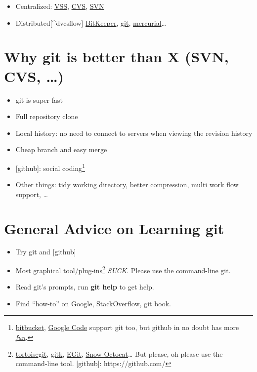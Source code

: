 \documentclass[]{article}
\begin{document}
\begin{itemize}
\item
  Centralized:
  \href{http://msdn.microsoft.com/en-us/library/3h0544kx(v=vs.80).aspx}{VSS},
  \href{http://www.nongnu.org/cvs/}{CVS},
  \href{http://subversion.apache.org/}{SVN}
\item
  Distributed{[}\^{}dvcsflow{]}
  \href{http://www.bitkeeper.com/}{BitKeeper},
  \href{http://git-scm.com/}{git},
  \href{http://mercurial.selenic.com/\%20{[}\^{}dvcsflow{]}:\%20Distributed\%20VCSs\%20support\%20centralized\%20work\%20flow\%20too.}{mercurial}\ldots{}
\end{itemize}
\section{Why git is better than X (SVN, CVS, \ldots{})}

\begin{itemize}
\item
  git is super fast
\item
  Full repository clone
\item
  Local history: no need to connect to servers when viewing the revision
  history
\item
  Cheap branch and easy merge
\item
  {[}github{]}: social coding\footnote{\href{https://bitbucket.org}{bitbucket},
    \href{http://code.google.com}{Google Code} support git too, but
    github in no doubt has more
    \href{http://shop.github.com/}{\emph{fun}}.}
\item
  Other things: tidy working directory, better compression, multi work
  flow support, \ldots{}
\end{itemize}
\section{General Advice on Learning git}

\begin{itemize}
\item
  Try git and {[}github{]}
\item
  Most graphical tool/plug-ins\footnote{\href{http://code.google.com/p/tortoisegit/}{tortoisegit},
    \href{http://lostechies.com/joshuaflanagan/2010/09/03/use-gitk-to-understand-git/}{gitk},
    \href{http://www.eclipse.org/egit/}{EGit},
    \href{https://github.com/blog/1067-github-for-mac-1-2-snow-octocat}{Snow
    Octocat}\ldots{} But please, oh please use the command-line tool.
    {[}github{]}: https://github.com/} \emph{SUCK}. Please use the
  command-line git.
\item
  Read git's prompts, run \textbf{git help} to get help.
\item
  Find ``how-to'' on Google, StackOverflow, git book.
\end{itemize}
\end{document}
